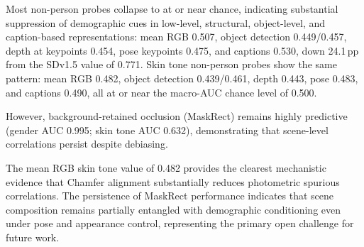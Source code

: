 Most non-person probes collapse to at or near chance, indicating substantial suppression
of demographic cues in low-level, structural, object-level, and caption-based
representations: mean RGB 0.507, object detection 0.449/0.457, depth at keypoints
0.454, pose keypoints 0.475, and captions 0.530, down 24.1\,pp from the SDv1.5 value of
0.771. Skin tone non-person probes show the same pattern: mean RGB 0.482, object
detection 0.439/0.461, depth 0.443, pose 0.483, and captions 0.490, all at or near the
macro-AUC chance level of 0.500.

However, background-retained occlusion (MaskRect) remains highly predictive (gender AUC 0.995; skin tone AUC 0.632), demonstrating that scene-level correlations persist despite debiasing.

The mean RGB skin tone value of 0.482 provides the clearest mechanistic evidence that
Chamfer alignment substantially reduces photometric spurious correlations. The persistence of MaskRect performance indicates that scene composition remains
partially entangled with demographic conditioning even under pose and appearance control,
representing the primary open challenge for future work.